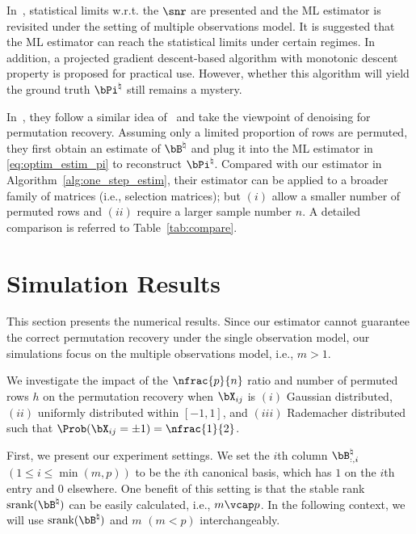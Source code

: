 \documentclass[11pt]{article}
\def \bPitrue {\bPi^{\natural}}
\def \bBtrue {\bB^{\natural}}
\def\srank#1{\textup{srank}(#1)}
\begin{document}
In~\citet{zhang2022permutation}, statistical
limits w.r.t. the $\snr$ are presented and
the ML estimator is revisited under the setting of multiple observations model.
It is suggested that the ML estimator can reach the statistical limits
under certain regimes. In addition, a projected gradient descent-based algorithm with monotonic descent property is proposed for practical use.
However, whether this algorithm will yield the ground truth $\bPitrue$ still remains a mystery.

In~\citet{slawski2020two}, they follow a similar
idea of~\citet{slawski2017linear} and take the
viewpoint of denoising for permutation recovery. Assuming only a limited proportion of rows are permuted, they first
obtain an estimate of $\bBtrue$ and
plug it
into the ML estimator in \eqref{eq:optim_estim_pi} to reconstruct $\bPitrue$.
Compared with our estimator in Algorithm~\ref{alg:one_step_estim}, their estimator can be applied to a broader
family of matrices (i.e., selection matrices);
but $(i)$ allow a smaller number of permuted rows and $(ii)$ require a larger sample number $n$.
A detailed comparison is referred to Table~\ref{tab:compare}.


\section{Simulation Results}
\label{sec:simul}
This section presents the numerical results. Since our estimator cannot guarantee the correct permutation recovery under the single observation model, our simulations focus on the multiple observations model, i.e., $m > 1$.

We investigate the impact of the $\nfrac{p}{n}$ ratio and
number of permuted rows $h$ on the permutation recovery
when $\bX_{ij}$ is $(i)$ Gaussian distributed,
$(ii)$ uniformly distributed within $[-1, 1]$, and
$(iii)$ Rademacher distributed such that
$\Prob(\bX_{ij} = \pm 1) = \nfrac{1}{2}$.

First, we present our experiment settings. We set the $i$th column
$\bBtrue_{:, i}$ $(1\leq i \leq \min(m,p))$
to be the $i$th canonical basis, which has $1$ on the
$i$th entry and $0$ elsewhere.
One benefit of this setting is that
the stable rank $\srank{\bBtrue}$
can be easily calculated, i.e., $m\vcap p$.
In the following context, we will use $\srank{\bBtrue}$ and
$m$ $(m < p)$ interchangeably.
\end{document}
